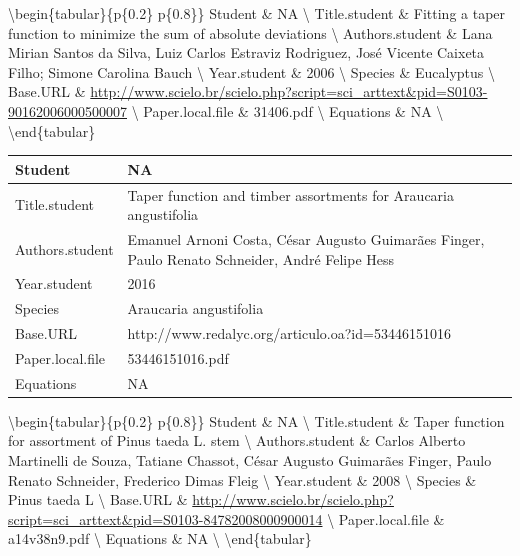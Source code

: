 \documentclass[]{article}
\begin{document}

\textbackslash{}begin\{tabular\}\{p\{0.2\textwidth\}
p\{0.8\textwidth\}\} \hline Student \& NA \textbackslash{} \hline
Title.student \& Fitting a taper function to minimize the sum of
absolute deviations \textbackslash{} \hline Authors.student \& Lana
Mirian Santos da Silva, Luiz Carlos Estraviz Rodriguez, José Vicente
Caixeta Filho; Simone Carolina Bauch \textbackslash{} \hline
Year.student \& 2006 \textbackslash{} \hline Species \& Eucalyptus
\textbackslash{} \hline Base.URL \&
\url{http://www.scielo.br/scielo.php?script=sci_arttext\&pid=S0103-90162006000500007}
\textbackslash{} \hline Paper.local.file \& 31406.pdf \textbackslash{}
\hline Equations \& NA \textbackslash{} \hline
\textbackslash{}end\{tabular\}

\begin{tabular}{p{} p{}}
\hline
Student & NA \\ \hline
Title.student & Taper function and timber assortments for Araucaria angustifolia \\ \hline
Authors.student & Emanuel Arnoni Costa, César Augusto Guimarães Finger, Paulo Renato Schneider, André Felipe Hess \\ \hline
Year.student & 2016 \\ \hline
Species & Araucaria angustifolia \\ \hline
Base.URL & http://www.redalyc.org/articulo.oa?id=53446151016 \\ \hline
Paper.local.file & 53446151016.pdf \\ \hline
Equations & NA \\ \hline
\end{tabular}


\textbackslash{}begin\{tabular\}\{p\{0.2\textwidth\}
p\{0.8\textwidth\}\} \hline Student \& NA \textbackslash{} \hline
Title.student \& Taper function for assortment of Pinus taeda L. stem
\textbackslash{} \hline Authors.student \& Carlos Alberto Martinelli de
Souza, Tatiane Chassot, César Augusto Guimarães Finger, Paulo Renato
Schneider, Frederico Dimas Fleig \textbackslash{} \hline Year.student \&
2008 \textbackslash{} \hline Species \& Pinus taeda L \textbackslash{}
\hline Base.URL \&
\url{http://www.scielo.br/scielo.php?script=sci_arttext\&pid=S0103-84782008000900014}
\textbackslash{} \hline Paper.local.file \& a14v38n9.pdf
\textbackslash{} \hline Equations \& NA \textbackslash{} \hline
\textbackslash{}end\{tabular\}
\end{document}
